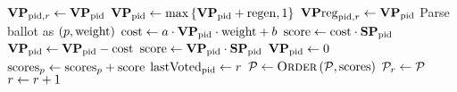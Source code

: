 \begin{algorithm}[H]
  \caption{$\textsc{HandleVote}\left(\mathrm{ballot},
  \player_{\pid}\right)$}
  \label{alg:steem:handlevote}
  \begin{algorithmic}[1]
     
      \State $\mathrm{\textbf{VP}}_{\mathrm{pid}, r} \gets \mathrm{\textbf{VP}}_{\mathrm{pid}}$ 
      \State $\mathrm{\textbf{VP}}_{\mathrm{pid}} \gets \max{\lbrace \mathrm{\textbf{VP}}_{\mathrm{pid}} + \mathrm{regen}, 1
      \rbrace}$
      \State $\mathrm{\textbf{VP}reg}_{\mathrm{pid}, r} \gets \mathrm{\textbf{VP}}_{\mathrm{pid}}$ 
      \label{alg:steem:handlevote:regen}
        \State Parse ballot as $\left(p, \mathrm{weight}\right)$
        \State $\mathrm{cost} \gets a \cdot \mathrm{\textbf{VP}}_{\mathrm{pid}} \cdot
        \mathrm{weight} + b$
        \label{alg:steem:handlevote:cost:start}
          \State $\mathrm{score} \gets \mathrm{cost} \cdot \mathrm{\textbf{SP}}_{\mathrm{pid}}$
          \State $\mathrm{\textbf{VP}}_{\mathrm{pid}} \gets \mathrm{\textbf{VP}}_{\mathrm{pid}} - \mathrm{cost}$
        \Else
          \State $\mathrm{score} \gets \mathrm{\textbf{VP}}_{\mathrm{pid}} \cdot
          \mathrm{\textbf{SP}}_{\mathrm{pid}}$
          \State $\mathrm{\textbf{VP}}_{\mathrm{pid}} \gets 0$
        \EndIf
        \label{alg:steem:handlevote:cost:end}
        \State $\mathrm{scores}_p \gets \mathrm{scores}_p +
        \mathrm{score}$
      \EndIf
      \State $\mathrm{lastVoted}_{\mathrm{pid}} \gets r$
    \EndIf
      \State $\mathcal{P} \gets \textsc{Order}\left(\mathcal{P},
      \mathrm{scores}\right)$ 
      \label{alg:steem:handlevote:order}
      \State $\mathcal{P}_r \gets \mathcal{P}$ 
      \State $r \gets r + 1$
    \EndIf
  \end{algorithmic}
\end{algorithm}
